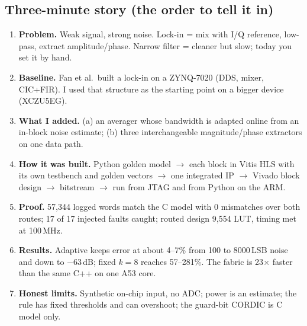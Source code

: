 \documentclass[10pt,a4paper]{article}
\begin{document}
\subsection{Three-minute story (the order to tell it in)}
\begin{enumerate}
\item \textbf{Problem.} Weak signal, strong noise. Lock-in = mix with I/Q reference, low-pass, extract amplitude/phase. Narrow filter = cleaner but slow; today you set it by hand.
\item \textbf{Baseline.} Fan et al.\ built a lock-in on a ZYNQ-7020 (DDS, mixer, CIC+FIR). I used that structure as the starting point on a bigger device (XCZU5EG).
\item \textbf{What I added.} (a) an averager whose bandwidth is adapted online from an in-block noise estimate; (b) three interchangeable magnitude/phase extractors on one data path.
\item \textbf{How it was built.} Python golden model $\to$ each block in Vitis HLS with its own testbench and golden vectors $\to$ one integrated IP $\to$ Vivado block design $\to$ bitstream $\to$ run from JTAG and from Python on the ARM.
\item \textbf{Proof.} 57,344 logged words match the C model with 0 mismatches over both routes; 17 of 17 injected faults caught; routed design 9,554 LUT, timing met at 100\,MHz.
\item \textbf{Results.} Adaptive keeps error at about 4--7\% from 100 to 8000\,LSB noise and down to $-63$\,dB; fixed $k=8$ reaches 57--281\%. The fabric is 23$\times$ faster than the same C++ on one A53 core.
\item \textbf{Honest limits.} Synthetic on-chip input, no ADC; power is an estimate; the rule has fixed thresholds and can overshoot; the guard-bit CORDIC is C model only.
\end{enumerate}
\end{document}
